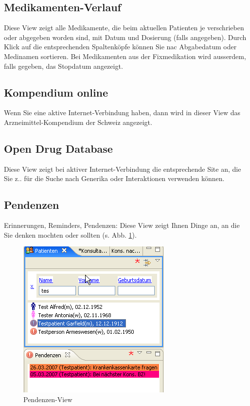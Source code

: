 \subsection{Medikamenten-Verlauf}
Diese View zeigt alle Medikamente, die beim aktuellen Patienten je verschrieben oder abgegeben worden sind, mit Datum und Dosierung (falls angegeben). Durch Klick auf die entsprechenden Spaltenköpfe können Sie nac Abgabedatum oder Medinamen sortieren. Bei Medikamenten aus der Fixmedikation wird ausserdem, falls gegeben, das Stopdatum angezeigt.

\subsection{Kompendium online}
Wenn Sie eine aktive Internet-Verbindung haben, dann wird in dieser View das
Arzneimit\-tel-Kom\-pen\-dium der Schweiz angezeigt.

\subsection{Open Drug Database}
Diese View zeigt bei aktiver Internet-Verbindung die entsprechende Site an, die Sie z.. für die Suche nach Generika oder Interaktionen verwenden können.

\subsection{Pendenzen}
Erinnerungen, Reminders, Pendenzen: Diese View zeigt Ihnen Dinge an, an die Sie
denken mochten oder sollten (s. Abb. \ref{fig:pendenzen}).

\begin{figure}
  \includegraphics{images/pendenzenview}
  \caption{Pendenzen-View}
  \label{fig:pendenzen}
\end{figure}

